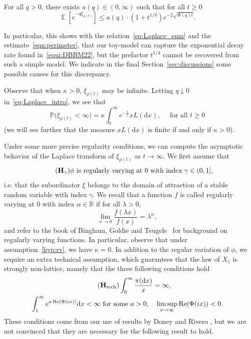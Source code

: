 \documentclass[AHL,Unicode,longabstracts,published]{cedram}
\newcommand{\R}{\mathbb{R}}
\newcommand{\bbP}{\mathbb{P}}
\DeclareMathOperator{\E}{\mathbb{E}}
\newcommand{\dd}{\mathrm{d}}
\DeclareMathOperator{\Ree}{Re}
\newcommand{\htec}{\mathbf{H}_{\mathrm{tech}}}
\begin{document}
\begin{prop}\label{prop:unifBound}
For all $q > 0$, there exists $a(q) \in (0,\infty)$ such that for all $t \geq 0$
\[
\E\left[e^{-q \xi_{\rho(t)}} \right] \leq a(q) \cdot \left(1+t^{1/8}\right) e^{-2 \sqrt{\Phi(q)t}}.
\]
\end{prop}

In particular, this shows with the relation~\eqref{eq:Laplace_sum} and the estimate~\eqref{eqn:perimeter}, that our toy-model can capture the exponential decay rate found in~\eqref{equi:DBBM22}, but the prefactor $t^{1/4}$ cannot be recovered from such a simple model. We indicate in the final Section~\ref{sec:discussions} some possible causes for this discrepancy.

\begin{rema}
Observe that when $\kappa>0$, $\xi_{\rho(t)}$ may be infinite. Letting $q \downarrow 0$ in~\eqref{eq:Laplace_intro}, we see that
\[
\bbP\big(\xi_{\rho(t)}<\infty\big)=\kappa \int_0^{\infty}e^{-\frac{t}{x}} xL(\dd x), \quad \text{ for all } t \geq 0
\]
(we will see further that the measure $xL(\dd x)$ is finite if and only if $\kappa>0$).
\end{rema}


Under some more precise regularity conditions, we can compute the asymptotic behavior of the Laplace transform of $\xi_{\rho(t)}$ as $t \to \infty$. We first assume that
\begin{equation}\label{hyp:rv}
\tag{$\mathbf{H_{\gamma}}$}
\phi \text{ is regularly varying at 0 with index }\gamma \in (0,1],
\end{equation}
i.e. that the subordinator $\xi$ belongs to the domain of attraction of a stable random variable with index $\gamma$. We recall that a function $f$ is called regularly varying at $0$ with index $\alpha \in \R $ if for all $\lambda > 0$,
\[
\lim_{x \to 0} \frac{f(\lambda x)}{f(x)} = \lambda^\alpha,
\]
and refer to the book of Bingham, Goldie and Teugels~\cite{BGT} for background on regularly varying functions. In particular, observe that under assumption~\eqref{hyp:rv}, we have $\kappa = 0$. In addition to the regular variation of $\phi$, we require an extra technical assumption, which guarantees that the law of $X_1$ is strongly non-lattice, namely that the three following conditions hold
\begin{multline}\label{hyp:tech}
\tag{$\htec$}
\int_0^{\infty}\frac{\pi(\dd x)}{x}=\infty, \\ \int_{1}^{\infty}e^{a\Ree (\Phi(ix))}\dd x<\infty \text{ for some }a>0, \quad \limsup_{x \rightarrow \infty} \Ree (\Phi(ix)) <0.
\end{multline}
These conditions come from our use of results by Doney and Rivero \cite{DR13,DR16_err}, but we are not convinced that they are necessary for the following result to hold.
\end{document}
